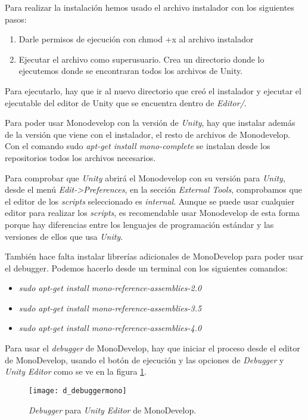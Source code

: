 Para realizar la instalación hemos usado el archivo instalador con los siguientes pasos:
\begin{enumerate}
\item Darle permisos de ejecución con chmod +x al archivo instalador
\item Ejecutar el archivo como superusuario. Crea un directorio donde lo ejecutemos donde se encontraran todos los archivos de Unity.
\end{enumerate}

Para ejecutarlo, hay que ir al nuevo directorio que creó el instalador y ejecutar el ejecutable del editor de Unity que se encuentra dentro de \textit{Editor/}. 

Para poder usar Monodevelop con la versión de \textit{Unity}, hay que instalar además de la versión que viene con el instalador, el resto de archivos de Monodevelop. Con el comando sudo \textit{apt-get install mono-complete} se instalan desde los repositorios todos los archivos necesarios.

Para comprobar que \textit{Unity} abrirá el Monodevelop con su versión para \textit{Unity}, desde el menú \textit{Edit->Preferences}, en la sección \textit{External Tools}, comprobamos que el editor de  los \textit{scripts} seleccionado es \textit{internal}. Aunque se puede usar cualquier editor para realizar los \textit{scripts}, es recomendable usar Monodevelop de esta forma porque hay diferencias entre los lenguajes de programación estándar y las versiones de ellos que usa \textit{Unity}.

También hace falta instalar librerías adicionales de MonoDevelop para poder usar el debugger. Podemos hacerlo desde un terminal con los siguientes comandos:
\begin{itemize}
\item \textit{sudo apt-get install mono-reference-assemblies-2.0}
\item \textit{sudo apt-get install mono-reference-assemblies-3.5}
\item \textit{sudo apt-get install mono-reference-assemblies-4.0}
\end{itemize}

Para usar el \textit{debugger} de MonoDevelop, hay que iniciar el proceso desde el editor de MonoDevelop, usando el botón de ejecución y las opciones de \textit{Debugger} y \textit{Unity Editor} como se ve en la figura \ref{fig:debuggermono}.

\begin{figure}[htpb]
    \centering
    \texttt{[image: d\_debuggermono]}
    \caption[\textit{Debugger} para \textit{Unity Editor} de MonoDevelop]{\textit{Debugger} para \textit{Unity Editor} de MonoDevelop.}
    \label{fig:debuggermono}
\end{figure}

